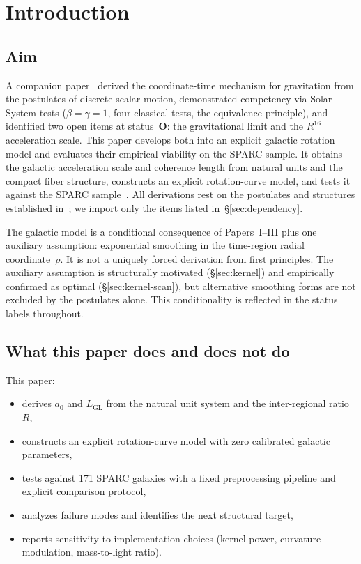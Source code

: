 \documentclass[11pt,a4paper]{article}
\begin{document}
\tableofcontents

\section{Introduction}
\label{sec:intro}

\subsection{Aim}

A companion paper~\cite{Wells2026c} derived the coordinate-time mechanism for gravitation from the postulates of discrete scalar motion, demonstrated competency via Solar System tests ($\beta = \gamma = 1$, four classical tests, the equivalence principle), and identified two open items at status~\textbf{O}: the gravitational limit and the $R^{16}$ acceleration scale.
This paper develops both into an explicit galactic rotation model and evaluates their empirical viability on the SPARC sample.
It obtains the galactic acceleration scale and coherence length from natural units and the compact fiber structure, constructs an explicit rotation-curve model, and tests it against the SPARC sample~\cite{Lelli2016}.
All derivations rest on the postulates and structures established in~\cite{Wells2026a,Wells2026b,Wells2026c}; we import only the items listed in~\S\ref{sec:dependency}.

The galactic model is a conditional consequence of Papers~I--III plus one auxiliary assumption: exponential smoothing in the time-region radial coordinate~$\rho$.
It is not a uniquely forced derivation from first principles.
The auxiliary assumption is structurally motivated (\S\ref{sec:kernel}) and empirically confirmed as optimal (\S\ref{sec:kernel-scan}), but alternative smoothing forms are not excluded by the postulates alone.
This conditionality is reflected in the status labels throughout.

\subsection{What this paper does and does not do}
\label{sec:scope}

This paper:
\begin{itemize}
\item derives $a_0$ and $L_{\mathrm{GL}}$ from the natural unit system and the inter-regional ratio~$R$,
\item constructs an explicit rotation-curve model with zero calibrated galactic parameters,
\item tests against 171 SPARC galaxies with a fixed preprocessing pipeline and explicit comparison protocol,
\item analyzes failure modes and identifies the next structural target,
\item reports sensitivity to implementation choices (kernel power, curvature modulation, mass-to-light ratio).
\end{itemize}
\end{document}
